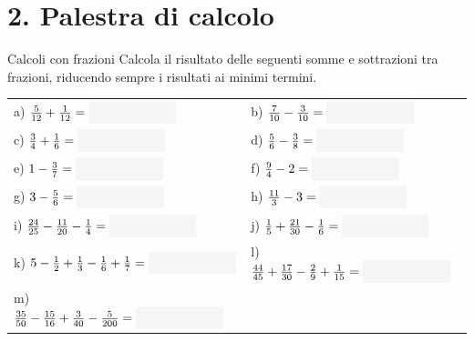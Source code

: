 \condnewpage


\section*{2. Palestra di calcolo}

\begin{esercizio}{Calcoli con frazioni}
Calcola il risultato delle seguenti somme e sottrazioni tra frazioni, riducendo sempre i risultati ai minimi termini.

\vspace{0.2cm}
\renewcommand{\arraystretch}{2.5}
\begin{tabularx}{\linewidth}{XX}
  a) $\frac{5}{12} + \frac{1}{12} = \fillbox{2.2cm}$ & b) $\frac{7}{10} - \frac{3}{10} = \fillbox{2.2cm}$ \\
  c) $\frac{3}{4} + \frac{1}{6} = \fillbox{2.2cm}$ & d) $\frac{5}{6} - \frac{3}{8} = \fillbox{2.2cm}$ \\
  e) $1 - \frac{3}{7} = \fillbox{2.2cm}$ & f) $\frac{9}{4} - 2 = \fillbox{2.2cm}$ \\
  g) $3 - \frac{5}{6} = \fillbox{2.2cm}$ & h) $\frac{11}{3} - 3 = \fillbox{2.2cm}$ \\
  i) $\frac{24}{25} - \frac{11}{20} - \frac{1}{4} = \fillbox{2.2cm}$ & j) $\frac{1}{5} + \frac{21}{30} - \frac{1}{6} = \fillbox{2.2cm}$ \\
  k) $5 - \frac{1}{2} + \frac{1}{3} - \frac{1}{6} + \frac{1}{7} = \fillbox{2.2cm}$ & l) $\frac{44}{45} + \frac{17}{30} - \frac{2}{9} + \frac{1}{15} = \fillbox{2.2cm}$ \\
  m) $\frac{35}{50} - \frac{15}{16} + \frac{3}{40} - \frac{5}{200} = \fillbox{2.2cm}$ & \\
\end{tabularx}
\vspace{0.2cm}

\responsespace{3.2cm}


\end{esercizio}
